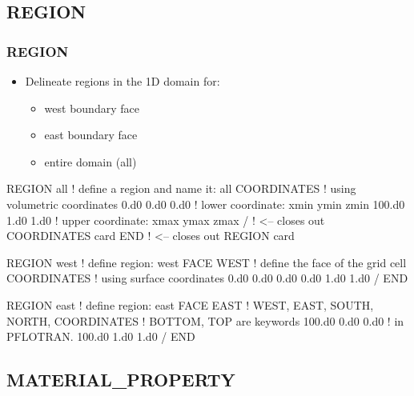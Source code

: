 \documentclass{beamer}
\newcommand\redcomment[1]{{{\color{red} #1}}}
\newcommand\bluecomment[1]{{{\color{blue} #1}}}
\newcommand\greencomment[1]{{{\color{green} #1}}}
\begin{document}
\subsection{REGION}

\begin{frame}\frametitle{REGION}

\begin{itemize}
  \item Delineate regions in the 1D domain for:
  \begin{itemize}
    \item west boundary face
    \item east boundary face
    \item entire domain (all)
  \end{itemize}
\end{itemize}

\begin{semiverbatim}
REGION all            \bluecomment{! define a region and name it: \greencomment{all}}
  COORDINATES         \bluecomment{! using \redcomment{volumetric} coordinates}
    0.d0 0.d0 0.d0    \bluecomment{! lower coordinate: xmin ymin zmin}
    100.d0 1.d0 1.d0  \bluecomment{! upper coordinate: xmax ymax zmax}
  /   \bluecomment{! <-- closes out COORDINATES card}
END   \bluecomment{! <-- closes out REGION card}

\newpage
REGION west           \bluecomment{! define region:} \greencomment{west}
  FACE WEST           \bluecomment{! define the face of the grid cell}
  COORDINATES         \bluecomment{! using \redcomment{surface} coordinates}
    0.d0 0.d0 0.d0
    0.d0 1.d0 1.d0
  /
END

REGION east           \bluecomment{! define region:} \greencomment{east}
  FACE EAST           \redcomment{! WEST, EAST, SOUTH, NORTH,}
  COORDINATES         \redcomment{!   BOTTOM, TOP} \bluecomment{ are keywords}
    100.d0 0.d0 0.d0  \bluecomment{!   in PFLOTRAN.}
    100.d0 1.d0 1.d0
  /
END

\end{semiverbatim}

\end{frame}

\subsection{MATERIAL\_PROPERTY}
\end{document}
